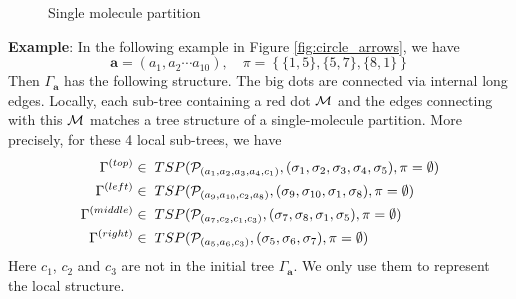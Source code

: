 \documentclass[10pt,reqno]{article}
\theoremstyle{plain} %
\theoremstyle{remark}
\numberwithin{equation}{section}
\begin{document}
\begin{figure}[ht]
    \caption{Single molecule partition}
    \label{fig:circle_arrows_0}
\end{figure}


\noindent 
{\bf Example}: In the following example in Figure \ref{fig:circle_arrows}, we have 
\begin{equation}\label{exn10}
  \textbf{a}=(a_1,a_2\cdots a_{10}), \quad \pi=\left\{ \{1,5\}, \{5,7\},\{8,1\}\right\}  
\end{equation} 
Then  $\Gamma_{\textbf{a}}$ has the following structure. The big dots are connected via internal long edges. Locally, each sub-tree containing a red dot ${\cal M}$ and the edges connecting with this $\cal M$ matches a tree structure of a single-molecule partition. More precisely, for these 4 local sub-trees, we have  
\begin{align}
 \Gamma^{(top)}\in \;&\;TSP ({\cal P}_{(a_1,a_2,a_3,a_4, c_1)}, (\sigma_1, \sigma_2,\sigma_3,\sigma_4,\sigma_5) , \pi=\emptyset )
 \\\nonumber 
 \Gamma^{(left)}\in \;&\;TSP ({\cal P}_{(a_9,a_{10},c_2,a_8)}, (\sigma_9, \sigma_{10},\sigma_1,\sigma_8) , \pi=\emptyset )
 \\\nonumber  
 \Gamma^{(middle)}\in \;&\;TSP ({\cal P}_{(a_7,c_2,c_1,c_3)}, (\sigma_7, \sigma_8,\sigma_1,\sigma_5) , \pi=\emptyset )
   \\\nonumber   
\Gamma^{(right)}\in \;&\;TSP ({\cal P}_{(a_5,a_6,c_3)}, (\sigma_5, \sigma_6,\sigma_7) , \pi=\emptyset )
\end{align}
Here $c_1$, $c_2$ and $c_3$ are not in the initial tree $\Gamma_{\textbf{a}}$. We only use them to represent the local structure. 
\end{document}
